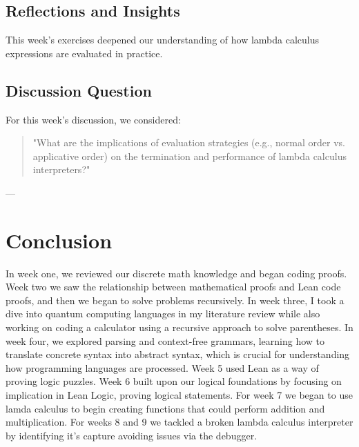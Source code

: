\documentclass{article}
\begin{document}
\subsection*{Reflections and Insights}

This week's exercises deepened our understanding of how lambda calculus expressions are evaluated in practice. 

\subsection*{Discussion Question}

For this week's discussion, we considered:

\begin{quote}
\small
"What are the implications of evaluation strategies (e.g., normal order vs. applicative order) on the termination and performance of lambda calculus interpreters?"
\end{quote}

---


\section*{Conclusion}
In week one, we reviewed our discrete math knowledge and began coding proofs. Week two we saw the relationship between mathematical proofs and Lean code proofs, and then we began to solve problems recursively. In week three, I took a dive into quantum computing languages in my literature review while also working on coding a calculator using a recursive approach to solve parentheses. In week four, we explored parsing and context-free grammars, learning how to translate concrete syntax into abstract syntax, which is crucial for understanding how programming languages are processed. Week 5 used Lean as a way of proving logic puzzles. Week 6 built upon our logical foundations by focusing on implication in Lean Logic, proving logical statements. For week 7 we began to use lamda calculus to begin creating functions that could perform addition and multiplication. For weeks 8 and 9 we tackled a broken lambda calculus interpreter by identifying it's capture avoiding issues via the debugger.
\end{document}
